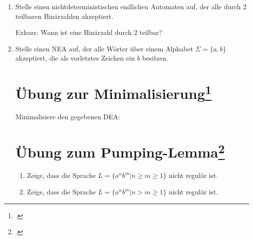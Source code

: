 \documentclass{lehramt-informatik-aufgabe}
\begin{document}
\begin{enumerate}
\item Stelle einen nichtdeterministischen endlichen Automaten auf, der
alle durch 2 teilbaren Binärzahlen akzeptiert.

Exkurs: Wann ist eine Binärzahl durch 2 teilbar?

\item Stelle einen NEA auf, der alle Wörter über einem Alphabet $\Sigma
= \{a,b\}$ akzeptiert, die als vorletztes Zeichen ein $b$ besitzen.

%

\section{Übung zur Minimalisierung\footcite[Seite 59]{theo:fs:1}}

Minimalisiere den gegebenen DEA:

\begin{center}
\end{center}

%

\section{Übung zum Pumping-Lemma\footcite[Seite 65]{theo:fs:1}}

\begin{enumerate}
\item Zeige, dass die Sprache $L = \{a^n b^m | n \geq m \geq 1\}$ nicht
regulär ist.

\item Zeige, dass die Sprache $L = \{a^n b^m | n > m \geq 1\}$ nicht
regulär ist.
\end{enumerate}

\end{enumerate}
\end{document}

